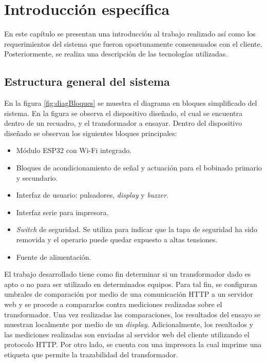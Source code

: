 \chapter{Introducción específica} %
\label{Chapter2}

En este capítulo se presentan una introducción al trabajo realizado así como los requerimientos del sistema que fueron oportunamente consensuados con el cliente. Posteriormente, se realiza una descripción de las tecnologías utilizadas.

\section{Estructura general del sistema}

En la figura \ref{fig:diagBloques} se muestra el diagrama en bloques simplificado del sistema. En la figura se observa el dispositivo diseñado, el cual se encuentra dentro de un recuadro, y el transformador a ensayar. Dentro del dispositivo diseñado se observan los siguientes bloques principales:

\begin{itemize}
\item Módulo ESP32 con Wi-Fi integrado.
\item Bloques de acondicionamiento de señal y actuación para el bobinado primario y secundario.
\item Interfaz de usuario: pulsadores, \textit{display} y \textit{buzzer}.
\item Interfaz serie para impresora.
\item \textit{Switch} de seguridad. Se utiliza para indicar que la tapa de seguridad ha sido removida y el operario puede quedar expuesto a altas tensiones.
\item Fuente de alimentación.
\end{itemize}

El trabajo desarrollado tiene como fin determinar si un transformador dado es apto o no para ser utilizado en determinados equipos. Para tal fin, se configuran umbrales de comparación por medio de una comunicación HTTP a un servidor web y se procede a compararlos contra mediciones realizadas sobre el transformador. Una vez realizadas las comparaciones, los resultados del ensayo se muestran localmente por medio de un \textit{display}. Adicionalmente, los resultados y las mediciones realizadas son enviadas al servidor web del cliente utilizando el protocolo HTTP. Por otro lado, se cuenta con una impresora la cual imprime una etiqueta que permite la trazabilidad del transformador.

